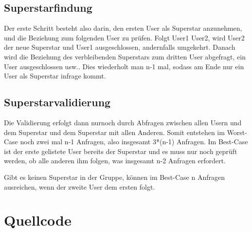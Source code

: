 \documentclass[a4paper,10pt,ngerman]{scrartcl}
\begin{document}
\subsection{Superstarfindung}
Der erste Schritt besteht also darin, den ersten User als Superstar anzunehmen, und die Beziehung zum folgenden User zu prüfen. Folgt User1 User2, wird User2 der neue Superstar und User1 ausgeschlossen, andernfalls umgekehrt. Danach wird die Beziehung des verbleibenden Superstars zum dritten User abgefragt, ein User ausgeschlossen usw.. Dies wiederholt man n-1 mal, sodass am Ende nur ein User als Superstar infrage kommt.

\subsection{Superstarvalidierung}
Die Validierung erfolgt dann nurnoch durch Abfragen zwischen allen Usern und dem Superstar und dem Superstar mit allen Anderen. Somit entstehen im Worst-Case noch zwei mal n-1 Anfragen, also insgesamt 3*(n-1) Anfragen. Im Best-Case ist der erste gelistete User bereits der Superstar und es muss nur noch geprüft werden, ob alle anderen ihm folgen, was insgesamt n-2 Anfragen erfordert.

Gibt es keinen Superstar in der Gruppe, können im Best-Case n Anfragen ausreichen, wenn der zweite User dem ersten folgt.


\section{Quellcode}
\end{document}
